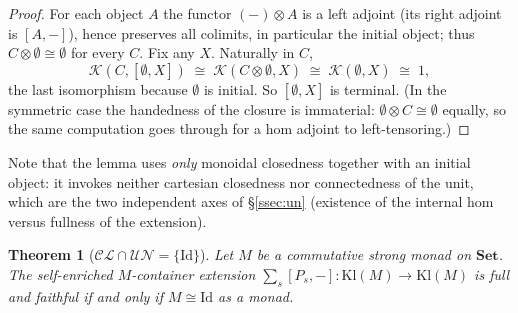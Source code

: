 \documentclass[11pt]{amsart}
\theoremstyle{plain}
\newtheorem{theorem}{Theorem}[section]
\theoremstyle{definition}
\theoremstyle{remark}
\newcommand{\Set}{\mathbf{Set}}
\newcommand{\Kl}{\mathrm{Kl}}
\newcommand{\Id}{\mathrm{Id}}
\newcommand{\CL}{\mathcal{CL}}
\newcommand{\UN}{\mathcal{UN}}
\begin{document}
\begin{proof}
For each object $A$ the functor $(-)\otimes A$ is a left adjoint (its right adjoint is $[A,-]$), hence
preserves all colimits, in particular the initial object; thus $C\otimes\emptyset\cong\emptyset$ for
every $C$. Fix any $X$. Naturally in $C$,
\[
  \mathcal{K}(C,[\emptyset,X])\;\cong\;\mathcal{K}(C\otimes\emptyset,X)\;\cong\;\mathcal{K}(\emptyset,X)\;\cong\;1,
\]
the last isomorphism because $\emptyset$ is initial. So $[\emptyset,X]$ is terminal. (In the symmetric
case the handedness of the closure is immaterial: $\emptyset\otimes C\cong\emptyset$ equally, so the
same computation goes through for a hom adjoint to left-tensoring.)
\end{proof}

Note that the lemma uses \emph{only} monoidal closedness together with an initial object: it invokes
neither cartesian closedness nor connectedness of the unit, which are the two independent axes of
\S\ref{ssec:un} (existence of the internal hom versus fullness of the extension).

\begin{theorem}[$\CL\cap\UN=\{\Id\}$]\label{thm:collapse}
Let $M$ be a commutative strong monad on $\Set$. The self-enriched $M$-container extension
$\sum_s[P_s,-]\colon\Kl(M)\to\Kl(M)$ is full and faithful if and only if $M\cong\Id$ as a monad.
\end{theorem}
\end{document}
